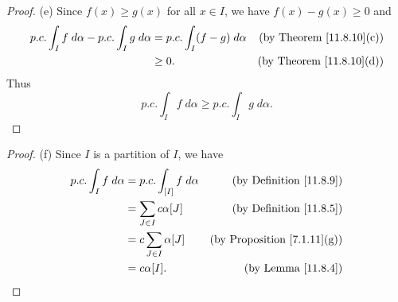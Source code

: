 \begin{proof}{(e)}
    Since \(f(x) \geq g(x)\) for all \(x \in I\), we have \(f(x) - g(x) \geq 0\) and
    \begin{align*}
        p.c. \int_I f \; d \alpha - p.c. \int_I g \; d \alpha & = p.c. \int_I (f - g) \; d \alpha & \text{(by Theorem \ref{11.8.10}(c))} \\
                                                              & \geq 0.                           & \text{(by Theorem \ref{11.8.10}(d))}
    \end{align*}
    Thus
    \[
        p.c. \int_I f \; d \alpha \geq p.c. \int_I g \; d \alpha.
    \]
\end{proof}

\begin{proof}{(f)}
    Since \(I\) is a partition of \(I\), we have
    \begin{align*}
        p.c. \int_I f \; d \alpha & = p.c. \int_{[I]} f \; d \alpha & \text{(by Definition \ref{11.8.9})}     \\
                                  & = \sum_{J \in I} c \alpha[J]    & \text{(by Definition \ref{11.8.5})}     \\
                                  & = c \sum_{J \in I} \alpha[J]    & \text{(by Proposition \ref{7.1.11}(g))} \\
                                  & = c \alpha[I].                  & \text{(by Lemma \ref{11.8.4})}
    \end{align*}
\end{proof}

